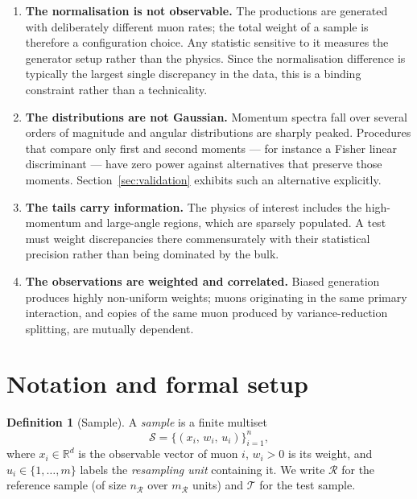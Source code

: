 \documentclass[11pt,a4paper]{article}
\theoremstyle{definition}
\newtheorem{definition}{Definition}[section]
\theoremstyle{plain}
\theoremstyle{remark}
\newcommand{\Rr}{\mathcal{R}}
\newcommand{\Tt}{\mathcal{T}}
\begin{document}
\begin{enumerate}
\item[(P1)] \textbf{The normalisation is not observable.} The productions are
generated with deliberately different muon rates; the total weight of a sample
is therefore a configuration choice. Any statistic sensitive to it measures the
generator setup rather than the physics. Since the normalisation difference is
typically the largest single discrepancy in the data, this is a binding
constraint rather than a technicality.

\item[(P2)] \textbf{The distributions are not Gaussian.} Momentum spectra fall
over several orders of magnitude and angular distributions are sharply peaked.
Procedures that compare only first and second moments --- for instance a Fisher
linear discriminant --- have zero power against alternatives that preserve
those moments. Section~\ref{sec:validation} exhibits such an alternative
explicitly.

\item[(P3)] \textbf{The tails carry information.} The physics of interest
includes the high-momentum and large-angle regions, which are sparsely
populated. A test must weight discrepancies there commensurately with their
statistical precision rather than being dominated by the bulk.

\item[(P4)] \textbf{The observations are weighted and correlated.} Biased
generation produces highly non-uniform weights; muons originating in the same
primary interaction, and copies of the same muon produced by variance-reduction
splitting, are mutually dependent.
\end{enumerate}

\section{Notation and formal setup}
\label{sec:setup}

\begin{definition}[Sample]
\label{def:sample}
A \emph{sample} is a finite multiset
\begin{equation}
  \mathcal{S} = \bigl\{(x_i,\, w_i,\, u_i)\bigr\}_{i=1}^{n},
\end{equation}
where $x_i \in \mathbb{R}^d$ is the observable vector of muon $i$, $w_i > 0$ is
its weight, and $u_i \in \{1,\dots,m\}$ labels the \emph{resampling unit}
containing it. We write $\Rr$ for the reference sample (of size $n_\Rr$ over
$m_\Rr$ units) and $\Tt$ for the test sample.
\end{definition}
\end{document}

